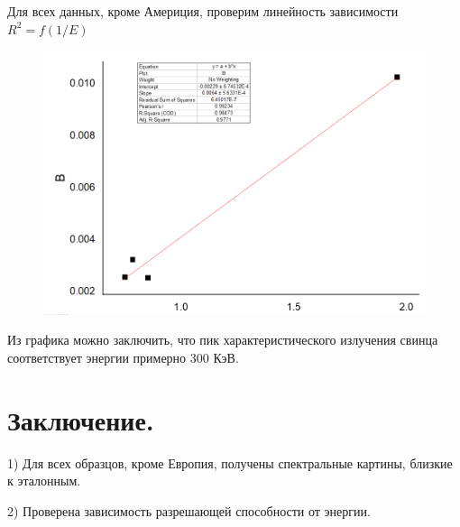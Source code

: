 \documentclass[%
 reprint,
 amsmath,amssymb,
 aps,
]{revtex4-2}
\begin{document}
Для всех данных, кроме Америция, проверим линейность зависимости $R^2 = f(1/E)$

\begin{figure}[h!]
	\includegraphics[scale=0.5]{5.png}
\end{figure}
 Из графика можно заключить, что пик характеристического излучения свинца соответствует энергии примерно $300$ КэВ.

\section{Заключение.}

1) Для всех образцов, кроме Европия, получены спектральные картины, близкие к эталонным.

2) Проверена зависимость разрешающей способности от энергии.
\end{document}
